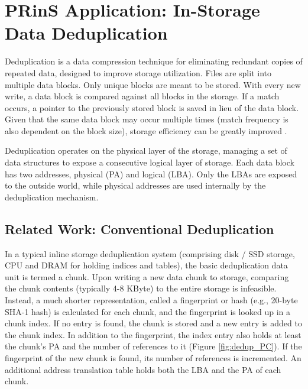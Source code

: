 \documentclass{superfri}
\begin{document}
	
	\section{PRinS Application: In-Storage Data Deduplication}
	\label{sec:dedup}
	Deduplication is a data compression technique for eliminating redundant copies of repeated data, designed to improve storage utilization. Files are split into multiple data blocks. Only unique blocks are meant to be stored. With every new write, a data block is compared against all blocks in the storage. If a match occurs, a pointer to the previously stored block is saved in lieu of the data block. Given that the same data block may occur multiple times (match frequency is also dependent on the block size), storage efficiency can be greatly improved \cite{zhu2008avoiding}.
	
	Deduplication operates on the physical layer of the storage, managing a set of data structures to expose a consecutive logical layer of storage. Each data block has two addresses, physical (PA) and logical (LBA). Only the LBAs are exposed to the outside world, while physical addresses are used internally by the deduplication mechanism.
	
	\subsection{Related Work: Conventional Deduplication}
	
	In a typical inline storage deduplication system (comprising disk / SSD storage, CPU and DRAM for holding indices and tables), the basic deduplication data unit is termed a chunk. Upon writing a new data chunk to storage, comparing the chunk contents (typically 4-8 KByte) to the entire storage is infeasible. Instead, a much shorter representation, called a fingerprint or hash (e.g., 20-byte SHA-1 hash) is calculated for each chunk, and the fingerprint is looked up in a chunk index. If no entry is found, the chunk is stored and a new entry is added to the chunk index. In addition to the fingerprint, the index entry also holds at least the chunk's PA and the number of references to it (Figure \ref{fig:dedup_PC}). If the fingerprint of the new chunk is found, its number of references is incremented. An additional address translation table holds both the LBA and the PA of each chunk.
	
\end{document}
